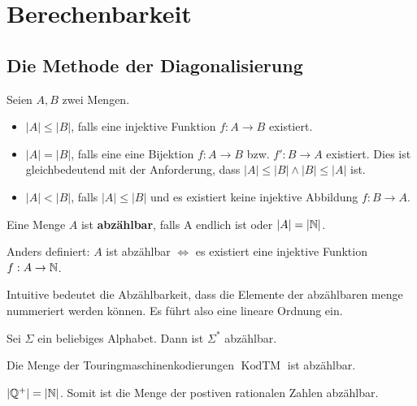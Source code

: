 \chapter{Berechenbarkeit}
\section{Die Methode der Diagonalisierung}
\begin{definition}
Seien \(A, B\) zwei Mengen.
\begin{itemize}
  \item \(|A| \leq |B|\), falls eine injektive Funktion \(f: A \to B\) existiert.
  \item \(|A| = |B|\), falls eine eine Bijektion \(f: A \to B\) bzw. \(f': B \to A\) existiert. Dies ist gleichbedeutend mit der Anforderung, dass \(|A| \leq |B| \land |B| \leq |A|\) ist.
  \item \(|A| < |B|\), falls \(|A| \leq |B|\) und es existiert keine injektive Abbildung \(f: B \to A\).\\
\end{itemize}
\end{definition}

\begin{definition}
Eine Menge \(A\) ist \textbf{abzählbar}, falls A endlich ist oder \(|A| = |\mathbb{N}|\).

Anders definiert: \(A\) ist abzählbar \(\Leftrightarrow\) es existiert eine injektive Funktion \(f: A \to \mathbb{N}\).
\end{definition}

Intuitive bedeutet die Abzählbarkeit, dass die Elemente der abzählbaren menge nummeriert werden können. Es führt also eine lineare Ordnung ein.

\begin{lemma}
Sei \(\Sigma\) ein beliebiges Alphabet. Dann ist \(\Sigma^*\) abzählbar.\\
\end{lemma}

\begin{satz}
Die Menge der Touringmaschinenkodierungen \(\operatorname{KodTM}\) ist abzählbar.\\
\end{satz}

\begin{lemma}
\( |\mathbb{Q}^+| = |\mathbb{N}| \). Somit ist die Menge der postiven rationalen Zahlen abzählbar. \\
\end{lemma}

